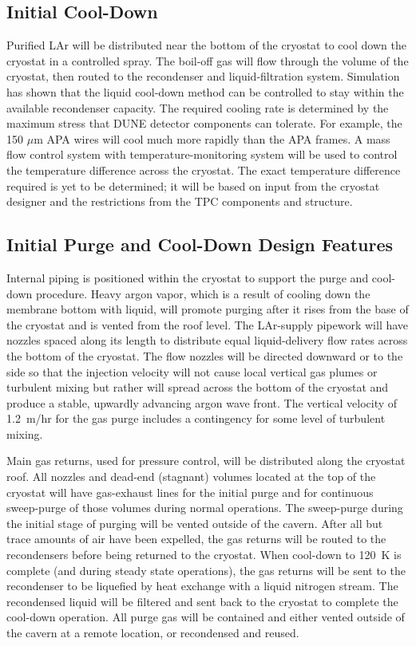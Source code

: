 \subsection{Initial Cool-Down}

Purified LAr will be distributed near
the bottom of the cryostat to cool down the cryostat in a controlled spray.
The boil-off gas will flow through the volume of the cryostat, then
routed to the recondenser and liquid-filtration system. Simulation
has shown that the liquid cool-down method can
be controlled to stay within the available recondenser capacity. The required cooling rate
is determined by the maximum stress that DUNE detector components can
tolerate. For example, the 150 $\mu$m APA wires will cool much more rapidly than the APA frames.
A mass flow control system with temperature-monitoring system will be used to control the
temperature difference across the cryostat. The exact temperature difference required is yet to
be determined; it will be based on input from the cryostat designer and the restrictions from
the TPC components and structure.

\subsection{Initial Purge and Cool-Down Design Features}

Internal piping is positioned within the cryostat to support the purge and cool-down procedure.  Heavy argon vapor, which is a result of cooling down the membrane bottom with liquid, will promote purging after it rises from the base of the cryostat and is vented from the roof level.  The LAr-supply pipework will have nozzles spaced along its length to 
 distribute equal liquid-delivery flow rates across the bottom of the cryostat.  The flow nozzles will be directed downward or to the side so that the injection velocity will not cause local vertical gas plumes or turbulent mixing but rather will spread across the bottom of the cryostat and produce a stable, upwardly advancing argon wave front. The vertical velocity of 1.2~m/hr for the gas purge includes a contingency for some level of turbulent mixing. 

Main gas returns, used for pressure control, will be distributed along the cryostat roof.  All nozzles and dead-end (stagnant) volumes located at the top of the cryostat will have gas-exhaust lines for the initial purge and for continuous sweep-purge of those volumes during normal operations.  
The sweep-purge during the initial stage of purging will be vented outside of the cavern.  After all but trace amounts of air have been expelled, the gas returns will be routed to the recondensers before being returned to the cryostat.  When cool-down to 120~K is complete (and during steady state operations), the gas returns will be sent to the recondenser to be liquefied by heat exchange with a liquid nitrogen stream.  The recondensed liquid will be filtered and sent back to the cryostat to complete the cool-down operation.
All purge gas will be contained and either vented outside of the cavern at a remote location, or recondensed and reused. 

